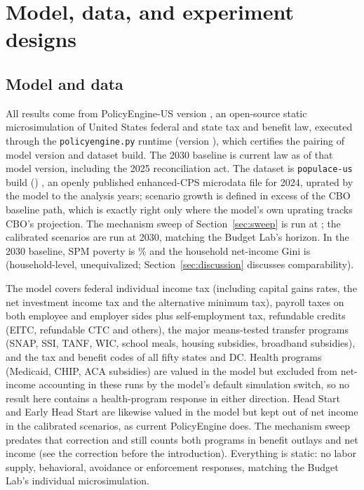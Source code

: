 \section{Model, data, and experiment designs}\label{sec:method}

\subsection{Model and data}

All results come from PolicyEngine-US version \genModelVersion{}
\citep{policyengineus}, an open-source static microsimulation of United
States federal and state tax and benefit law, executed through the
\texttt{policyengine.py} runtime (version \genRunnerVersion{}), which
certifies the pairing of model version and dataset build. The 2030 baseline
is current law as of that model version, including the 2025 reconciliation
act. The dataset is \texttt{populace-us} build \texttt{\genDataBuildShort}
(\genDataBuildDate{}) \citep{populaceus}, an openly published enhanced-CPS
microdata file for 2024, uprated by the model to the analysis years; scenario
growth is defined in excess of the CBO baseline path, which is exactly right
only where the model's own uprating tracks CBO's projection. The mechanism
sweep of Section~\ref{sec:sweep} is run at \genSweepYear{}; the calibrated
scenarios are run at 2030, matching the Budget Lab's horizon. In the 2030
baseline, SPM poverty is \genBaselinePovertyPct\% and the household
net-income Gini is \genBaselineGini{} (household-level, unequivalized;
Section~\ref{sec:discussion} discusses comparability).

The model covers federal individual income tax (including capital gains
rates, the net investment income tax and the alternative minimum tax),
payroll taxes on both employee and employer sides plus self-employment tax,
refundable credits (EITC, refundable CTC and others), the major means-tested
transfer programs (SNAP, SSI, TANF, WIC, school meals, housing subsidies,
broadband subsidies), and the tax and benefit codes of all fifty states and
DC. Health programs (Medicaid, CHIP, ACA subsidies) are valued in the model
but excluded from net-income accounting in these runs by the model's default
simulation switch, so no result here contains a health-program response in
either direction. Head Start and Early Head Start are likewise valued in the
model but kept out of net income in the calibrated scenarios, as current
PolicyEngine does. The mechanism sweep predates that correction and still
counts both programs in benefit outlays and net income (see the correction
before the introduction). Everything is static: no labor supply, behavioral,
avoidance or enforcement responses, matching the Budget Lab's individual
microsimulation.

